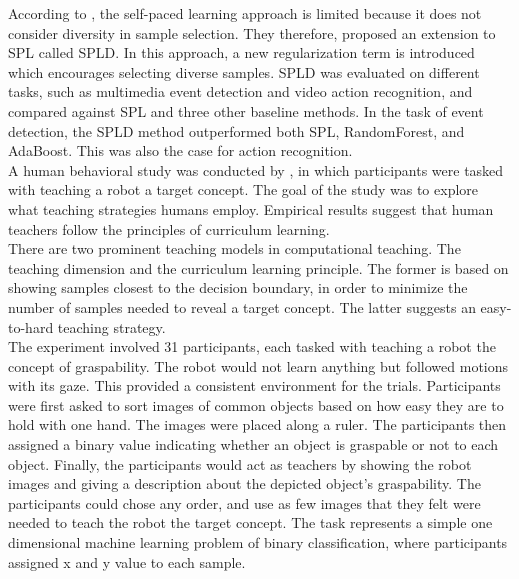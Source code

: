 According to \cite{Lu_self-paced_learning_diversity}, the self-paced learning approach is limited because it does not consider diversity in sample selection. They therefore, proposed an extension to \ac{SPL} called \ac{SPLD}. In this approach, a new regularization term is introduced which encourages selecting diverse samples. \ac{SPLD} was evaluated on different tasks, such as multimedia event detection and video action recognition, and compared against \ac{SPL} and three other baseline methods. In the task of event detection, the \ac{SPLD} method outperformed both \ac{SPL}, RandomForest, and AdaBoost. This was also the case for action recognition.\\




A human behavioral study was conducted by \citep{Khan_human_teach}, in which participants were tasked with teaching a robot a target concept. The goal of the study was to explore what teaching strategies humans employ. Empirical results suggest that human teachers follow the principles of curriculum learning. \\

There are two prominent teaching models in computational teaching. The teaching dimension and the curriculum  learning principle. The former is based on showing samples closest to the decision boundary, in order to minimize the number of samples needed to reveal a target concept. The latter suggests an easy-to-hard teaching strategy. \\

The experiment involved 31 participants, each tasked with teaching a robot the concept of graspability. The robot would not learn anything but followed motions with its gaze. This provided a consistent environment for the trials. Participants were first asked to sort images of common objects based on how easy they are to hold with one hand. The images were placed along a ruler.  The participants then assigned a binary value indicating whether an object is graspable or not to each object. Finally, the participants would act as teachers by showing the robot images and giving a description about the depicted object's graspability. The participants could chose any order, and use as few images that they felt were needed to teach the robot the target concept. The task represents a simple one dimensional machine learning problem of binary classification, where participants assigned x and y value to each sample. \\

